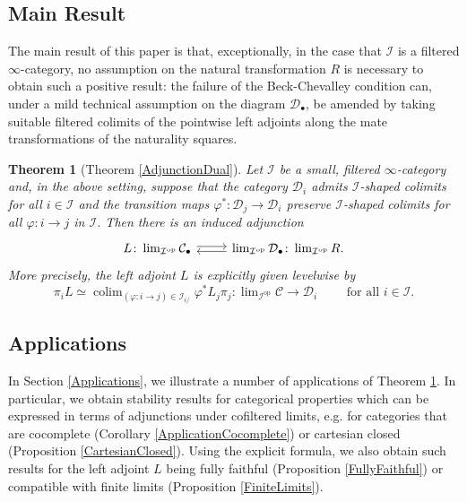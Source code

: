 \documentclass[a4paper,reqno,10pt]{amsart}
\newtheorem{introtheorem}{Theorem}
\theoremstyle{definition}
\theoremstyle{remark}
\newcommand{\C}{\mathcal{C}}
\newcommand{\D}{\mathcal{D}}
\newcommand{\I}{\mathcal{I}}
\DeclareMathOperator*{\colim}{colim}
\newcommand{\op}{\mathrm{op}}
\newcommand{\singlequote}[1]{\textquotesingle #1\textquotesingle}
\newcommand{\Adj}{\arrow[r,shift left=0.2em]\arrow[r,leftarrow,shift right=0.2em]}
\begin{document}
\subsection*{Main Result} The main result of this paper is that, exceptionally, in the case that $\I$ is a filtered $\infty$-category, no assumption on the natural transformation $R$ is necessary to obtain such a positive result: the failure of the Beck-Chevalley condition can, under a mild technical assumption on the diagram $\D_{\bullet}$, be amended by taking suitable filtered colimits of the pointwise left adjoints along the mate transformations of the naturality squares.

\begin{introtheorem}[Theorem \ref{AdjunctionDual}]\label{IntroAdjunction}
Let $\I$ be a small, filtered $\infty$-category and, in the above setting, suppose that the category $\D_i$ admits $\I$-shaped colimits for all $i\in\I$ and the transition maps $\varphi^{\ast}\colon\D_j\rightarrow\D_i$ preserve $\I$-shaped colimits for all $\varphi\colon i\rightarrow j$ in $\I$. Then there is an induced adjunction
\begin{equation*}
\begin{tikzcd}
L\colon\lim_{\I^{\op}}\C_{\bullet}\Adj & \lim_{\I^{\op}}\D_{\bullet}\colon\lim_{\I^{\op}}R.
\end{tikzcd}
\end{equation*}
More precisely, the left adjoint $L$ is explicitly given levelwise by
\begin{equation*}
\pi_iL\simeq\colim_{(\varphi\colon i\rightarrow j)\in\I_{i/}}\varphi^{\ast}L_j\pi_j\colon\lim\nolimits_{\I^{\op}}\C\rightarrow\D_i\qquad\text{ for all }i\in\I.
\end{equation*}
\end{introtheorem}

\subsection*{Applications} In Section \ref{Applications}, we illustrate a number of applications of Theorem \ref{IntroAdjunction}. In particular, we obtain \singlequote{stability} results for categorical properties which can be expressed in terms of adjunctions under cofiltered limits, e.g. for categories that are cocomplete (Corollary \ref{ApplicationCocomplete}) or cartesian closed (Proposition \ref{CartesianClosed}). Using the explicit formula, we also obtain such results for the left adjoint $L$ being fully faithful (Proposition \ref{FullyFaithful}) or compatible with finite limits (Proposition \ref{FiniteLimits}).
\end{document}
